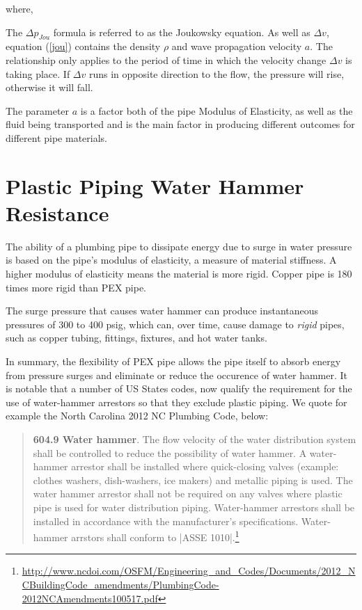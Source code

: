 where,

The $\Delta p_{Jou}$ formula is referred to
as the Joukowsky equation. As
well as $\Delta v$, equation (\ref{jou}) contains
the density $\rho$ and wave
propagation velocity $a$. The relationship
only applies to the period
of time in which the velocity
change $\Delta v$ is taking place. If
$\Delta v$ runs in opposite direction to
the flow, the pressure will rise,
otherwise it will fall. 

The parameter $a$ is a factor both of the pipe Modulus of Elasticity, as well as the fluid being transported and is the main factor in producing different outcomes for different pipe materials.

\section{Plastic Piping Water Hammer Resistance}

The ability of a plumbing pipe to dissipate energy due to surge in water pressure is based on the pipe’s modulus of elasticity, a measure of material stiffness. A higher modulus of elasticity means the material is more rigid. Copper pipe is 180 times more rigid than PEX pipe.

The surge pressure that causes water hammer can produce instantaneous pressures of 300 to 400 psig, which can, over time, cause damage to \textit{rigid} pipes, such as copper tubing, fittings, fixtures, and hot water tanks. 

In summary, the flexibility of PEX pipe allows the pipe itself to absorb energy from pressure surges and eliminate or reduce  the occurence of water hammer. It is notable that a number of US States codes, now qualify the requirement for the use of water-hammer arrestors so that they exclude plastic piping. We quote for example the North Carolina 2012 NC Plumbing Code, below:

\begin{quotation}
\textbf{604.9 Water hammer}. The flow velocity of the water distribution system shall be controlled to reduce the possibility of water hammer. A water-hammer arrestor shall be installed where quick-closing valves (example: clothes washers, dish-washers, ice makers) and metallic piping is used. The water hammer arrestor shall not be required on any valves where plastic pipe is used for water distribution piping. Water-hammer arrestors shall be installed in accordance with the manufacturer’s specifications. Water-hammer arrstors shall conform to |ASSE 1010|.\footnote{\protect\url{http://www.ncdoi.com/OSFM/Engineering_and_Codes/Documents/2012_NCBuildingCode_amendments/PlumbingCode-2012NCAmendments100517.pdf}} 
\end{quotation}

